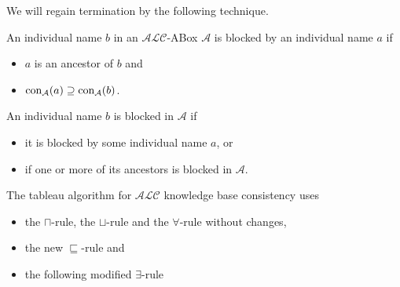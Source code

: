 We will regain termination by the following technique.
\begin{definition}\label{def:blocking}
	An individual name $b$ in an $\mathcal{ALC}$-ABox $\mathcal{A}$ is blocked by an individual name $a$ if
	\begin{itemize}
		\item $a$ is an ancestor of $b$ and
		\item $\operatorname{\text{con}}_{\mathcal{A}}(a) \supseteq \operatorname{\text{con}}_{\mathcal{A}}(b)$.
	\end{itemize}
	An individual name $b$ is blocked in $\mathcal{A}$ if
	\begin{itemize}
		\item it is blocked by some individual name $a$, or
		\item if one or more of its ancestors is blocked in $\mathcal{A}$.
	\end{itemize}
\end{definition}

The tableau algorithm for $\mathcal{ALC}$ knowledge base consistency uses
\begin{itemize}
	\item the $\sqcap$-rule, the $\sqcup$-rule and the $\forall$-rule without changes,
	\item the new $\sqsubseteq$-rule and
	\item the following modified $\exists$-rule
\end{itemize}

